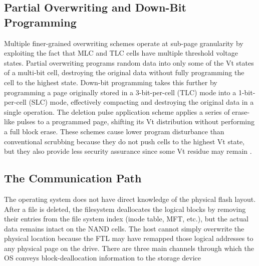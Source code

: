 \subsection{Partial Overwriting and Down-Bit Programming}
Multiple finer-grained overwriting schemes operate at sub-page granularity by exploiting the fact 
that MLC and TLC cells have multiple threshold voltage states. Partial overwriting programs random 
data into only some of the Vt states of a multi-bit cell, destroying the original data without fully 
programming the cell to the highest state. Down-bit programming takes this further by programming a 
page originally stored in a 3-bit-per-cell (TLC) mode into a 1-bit-per-cell (SLC) mode, effectively 
compacting and destroying the original data in a single operation. The deletion pulse application 
scheme applies a series of erase-like pulses to a programmed page, shifting its Vt distribution 
without performing a full block erase. These schemes cause lower program disturbance than 
conventional scrubbing because they do not push cells to the highest Vt state, but they also provide 
less security assurance since some Vt residue may remain \cite{ahn2019schemes,ahn2022security}. 

\subsection{The Communication Path}
The operating system does not have direct knowledge of the physical flash layout. After a file is 
deleted, the filesystem deallocates the logical blocks by removing their entries from the file 
system index (inode table, MFT, etc.), but the actual data remains intact on the NAND cells. The host 
cannot simply overwrite the physical location because the FTL may have remapped those logical 
addresses to any physical page on the drive. There are three main channels through which the OS 
conveys block-deallocation information to the storage device

